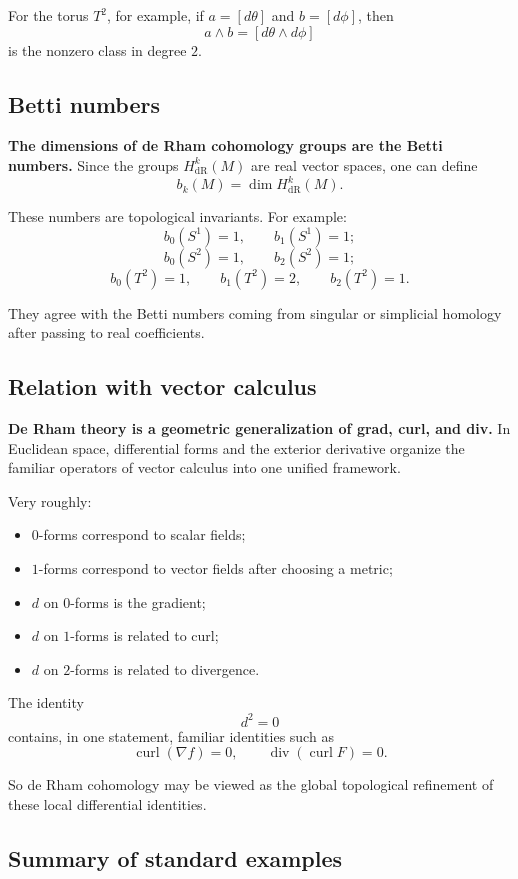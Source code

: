 \documentclass[12pt,a4paper]{article}
\theoremstyle{notespace}
\begin{document}
For the torus \(T^2\), for example, if \(a=[d\theta]\) and \(b=[d\phi]\), then
\[
a\wedge b=[d\theta\wedge d\phi]
\]
is the nonzero class in degree \(2\).

\subsection{Betti numbers}

\textbf{The dimensions of de Rham cohomology groups are the Betti numbers.} Since the groups \(H^k_{\mathrm{dR}}(M)\) are real vector spaces, one can define
\[
b_k(M)=\dim H^k_{\mathrm{dR}}(M).
\]

These numbers are topological invariants. For example:
\[
b_0(S^1)=1,\qquad b_1(S^1)=1;
\]
\[
b_0(S^2)=1,\qquad b_2(S^2)=1;
\]
\[
b_0(T^2)=1,\qquad b_1(T^2)=2,\qquad b_2(T^2)=1.
\]

They agree with the Betti numbers coming from singular or simplicial homology after passing to real coefficients.

\subsection{Relation with vector calculus}

\textbf{De Rham theory is a geometric generalization of grad, curl, and div.} In Euclidean space, differential forms and the exterior derivative organize the familiar operators of vector calculus into one unified framework.

Very roughly:

\begin{itemize}
	\item \(0\)-forms correspond to scalar fields;
	\item \(1\)-forms correspond to vector fields after choosing a metric;
	\item \(d\) on \(0\)-forms is the gradient;
	\item \(d\) on \(1\)-forms is related to curl;
	\item \(d\) on \(2\)-forms is related to divergence.
\end{itemize}

The identity
\[
d^2=0
\]
contains, in one statement, familiar identities such as
\[
\operatorname{curl}(\nabla f)=0,
\qquad
\operatorname{div}(\operatorname{curl} F)=0.
\]

So de Rham cohomology may be viewed as the global topological refinement of these local differential identities.

\subsection{Summary of standard examples}
\end{document}
